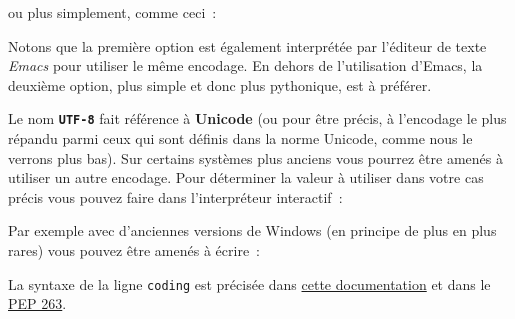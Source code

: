 \begin{Shaded}
\begin{Highlighting}[frame=lines,framerule=0.6mm,rulecolor=\color{asisframecolor}]
\end{Highlighting}
\end{Shaded}

ou plus simplement, comme ceci~:

\begin{Shaded}
\begin{Highlighting}[frame=lines,framerule=0.6mm,rulecolor=\color{asisframecolor}]
\end{Highlighting}
\end{Shaded}

Notons que la première option est également interprétée par l'éditeur de
texte \emph{Emacs} pour utiliser le même encodage. En dehors de
l'utilisation d'Emacs, la deuxième option, plus simple et donc plus
pythonique, est à préférer.

    Le nom \textbf{\texttt{UTF-8}} fait référence à \textbf{Unicode} (ou
pour être précis, à l'encodage le plus répandu parmi ceux qui sont
définis dans la norme Unicode, comme nous le verrons plus bas). Sur
certains systèmes plus anciens vous pourrez être amenés à utiliser un
autre encodage. Pour déterminer la valeur à utiliser dans votre cas
précis vous pouvez faire dans l'interpréteur interactif~:

    \begin{Shaded}
\begin{Highlighting}[frame=lines,framerule=0.6mm,rulecolor=\color{asisframecolor}]
\end{Highlighting}
\end{Shaded}

    Par exemple avec d'anciennes versions de Windows (en principe de plus en
plus rares) vous pouvez être amenés à écrire~:

    \begin{Shaded}
\begin{Highlighting}[frame=lines,framerule=0.6mm,rulecolor=\color{asisframecolor}]
\end{Highlighting}
\end{Shaded}

    La syntaxe de la ligne \texttt{coding} est précisée dans
\href{https://docs.python.org/3/reference/lexical_analysis.html\#encoding-declarations}{cette
documentation} et dans le
\href{https://www.python.org/dev/peps/pep-0263/}{PEP 263}.

